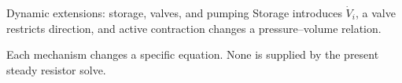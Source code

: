 \documentclass[aspectratio=169,11pt]{beamer}
\newcommand{\notestarget}{notes.pdf}\newcommand{\noteslabel}{Notes}
\begin{document}
\renewcommand{\notestarget}{notes.pdf\#note-computational-residuals-and-the-scope-of-a-claim}
\begin{frame}[t,fragile,label=slide-dynamic-extensions-storage-valves-and-pumping]{Dynamic extensions: storage, valves, and pumping}
Storage introduces $\dot V_i$, a valve restricts direction, and active contraction changes a pressure--volume relation.\pause{}\par Each mechanism changes a specific equation. None is supplied by the present steady resistor solve.
\end{frame}
\end{document}
